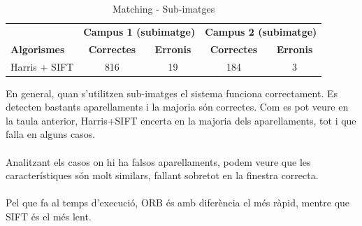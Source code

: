 		\begin{table}[H]
			\begin{center}
				\begin{tabular}{l | c c | c c}
					& \multicolumn{2}{c|}{\textbf{Campus 1 (subimatge)}} & \multicolumn{2}{c}{\textbf{Campus 2 (subimatge)}} \\
					\textbf{Algorismes} & \textbf{Correctes} & \textbf{Erronis} & \textbf{Correctes} & \textbf{Erronis} \\ \hline
					Harris + SIFT & 816 & 19 & 184 & 3 \\
				\end{tabular}
			\end{center}
			\caption{Matching - Sub-imatges}
		\end{table}

		\noindent
		En general, quan s'utilitzen sub-imatges el sistema funciona correctament. Es detecten bastants aparellaments i la majoria són correctes. Com es pot veure en la taula anterior,
		Harris+SIFT encerta en la majoria dels aparellaments, tot i que falla en alguns casos.\\\\
		Analitzant els casos on hi ha falsos aparellaments, podem veure que les característiques són molt similars, fallant sobretot en la finestra correcta.\\\\
		Pel que fa al temps d'execució, ORB és amb diferència el més ràpid, mentre que SIFT és el més lent.\\

